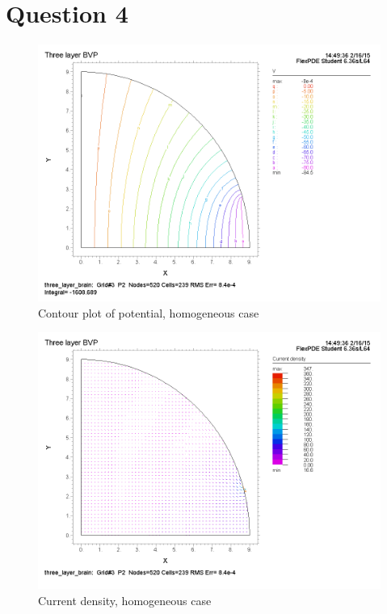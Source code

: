 \documentclass{article}
\author{Allen Yin}
\begin{document}
\maketitle
\setlength\parskip{0.1in}

\section{Question 4}

\begin{figure}[H]
    \begin{center}
        \includegraphics[scale=0.5]{homo_contourV.png}
        \caption{Contour plot of potential, homogeneous case}
    \end{center}
\end{figure}

\begin{figure}[H]
    \begin{center}
        \includegraphics[scale=0.5]{homo_CD.png}
        \caption{Current density, homogeneous case}
    \end{center}
\end{figure}
\end{document}
